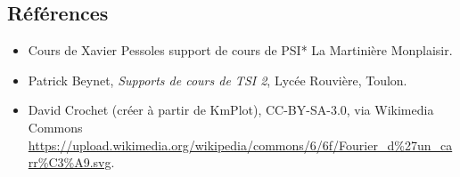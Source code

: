 \subsection{Références} 
\begin{itemize}
\item Cours de Xavier Pessoles support de cours de  PSI* La Martinière Monplaisir.
\item Patrick Beynet, \textit{Supports de cours de TSI 2}, Lycée Rouvière, Toulon.
\item David Crochet (créer à partir de KmPlot), CC-BY-SA-3.0, via Wikimedia Commons \url{https://upload.wikimedia.org/wikipedia/commons/6/6f/Fourier_d\%27un_carr\%C3\%A9.svg}.
\end{itemize}